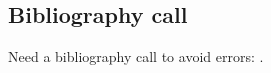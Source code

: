 \begin{appendix}

\section{Bibliography call}
Need a bibliography call to avoid errors: \cite{Mills1972}.

\end{appendix}